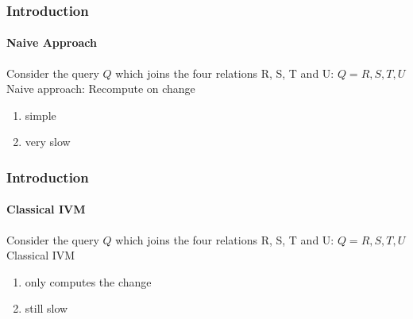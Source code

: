 \documentclass[
	11pt, %
]{beamer}
\newcommand\pro{\item[$+$]}
\newcommand\con{\item[$-$]}
\begin{document}
\begin{frame}
	\frametitle{Introduction}
	\framesubtitle{Naive Approach}
	Consider the query $Q$ which joins the four relations R, S, T and U:
	$Q = R, S, T, U$\\
	\vspace{1cm}
	Naive approach: Recompute on change
	\begin{enumerate}
		\pro simple
		\con very slow
	\end{enumerate}
\end{frame}
\begin{frame}
	\frametitle{Introduction}
	\framesubtitle{Classical IVM}
	Consider the query $Q$ which joins the four relations R, S, T and U:
	$Q = R, S, T, U$\\
	\vspace{1cm}
	Classical IVM
	\begin{enumerate}
		\pro only computes the change
		\con still slow
	\end{enumerate}
\end{frame}
\end{document}
